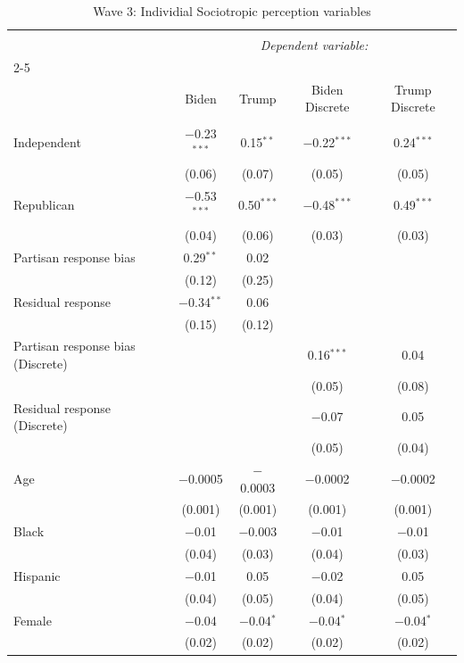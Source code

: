 \documentclass{article}\usepackage[]{graphicx}\usepackage[]{xcolor}
\begin{document}
\begin{table}[H]
\centering
\caption{Wave 3: Individial Sociotropic perception variables}

\begin{tabular}{@{\extracolsep{5pt}}lcccc} 
\\[-1.8ex]\hline 
\hline \\[-1.8ex] 
 & \multicolumn{4}{c}{\textit{Dependent variable:}} \\ 
\cline{2-5} 
\\[-1.8ex] & Biden & Trump & Biden Discrete & Trump Discrete \\ 
\hline \\[-1.8ex] 
 Independent & $-$0.23$^{***}$ & 0.15$^{**}$ & $-$0.22$^{***}$ & 0.24$^{***}$ \\ 
  & (0.06) & (0.07) & (0.05) & (0.05) \\ 
  Republican & $-$0.53$^{***}$ & 0.50$^{***}$ & $-$0.48$^{***}$ & 0.49$^{***}$ \\ 
  & (0.04) & (0.06) & (0.03) & (0.03) \\ 
  Partisan response bias & 0.29$^{**}$ & 0.02 &  &  \\ 
  & (0.12) & (0.25) &  &  \\ 
  Residual response & $-$0.34$^{**}$ & 0.06 &  &  \\ 
  & (0.15) & (0.12) &  &  \\ 
  Partisan response bias (Discrete) &  &  & 0.16$^{***}$ & 0.04 \\ 
  &  &  & (0.05) & (0.08) \\ 
  Residual response (Discrete) &  &  & $-$0.07 & 0.05 \\ 
  &  &  & (0.05) & (0.04) \\ 
  Age & $-$0.0005 & $-$0.0003 & $-$0.0002 & $-$0.0002 \\ 
  & (0.001) & (0.001) & (0.001) & (0.001) \\ 
  Black & $-$0.01 & $-$0.003 & $-$0.01 & $-$0.01 \\ 
  & (0.04) & (0.03) & (0.04) & (0.03) \\ 
  Hispanic & $-$0.01 & 0.05 & $-$0.02 & 0.05 \\ 
  & (0.04) & (0.05) & (0.04) & (0.05) \\ 
  Female & $-$0.04 & $-$0.04$^{*}$ & $-$0.04$^{*}$ & $-$0.04$^{*}$ \\ 
  & (0.02) & (0.02) & (0.02) & (0.02) \\ 

\end{tabular}
\end{table}
\end{document}
